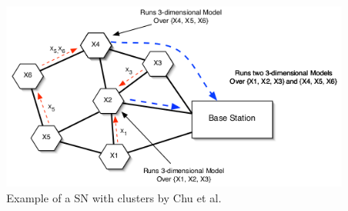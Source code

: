 \begin{figure}[h]
\includegraphics[width=\linewidth]{images/ken-clustering.png}
\caption{Example of a \ac{SN} with clusters by Chu et al.~\cite{chu2006approximate}}
\label{fig:cluster Chu}
\centering
\end{figure}

